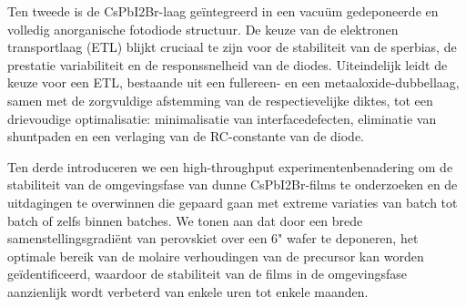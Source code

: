 Ten tweede is de CsPbI2Br-laag geïntegreerd in een vacuüm gedeponeerde en volledig anorganische fotodiode structuur. De keuze van de elektronen transportlaag (ETL) blijkt cruciaal te zijn voor de stabiliteit van de sperbias, de prestatie variabiliteit en de responssnelheid van de diodes. Uiteindelijk leidt de keuze voor een ETL, bestaande uit een fullereen- en een metaaloxide-dubbellaag, samen met de zorgvuldige afstemming van de respectievelijke diktes, tot een drievoudige optimalisatie: minimalisatie van interfacedefecten, eliminatie van shuntpaden en een verlaging van de RC-constante van de
diode.

Ten derde introduceren we een high-throughput experimentenbenadering om de stabiliteit van de omgevingsfase van dunne CsPbI2Br-films te onderzoeken en de uitdagingen te overwinnen die gepaard gaan met extreme variaties van batch tot batch of zelfs binnen batches. We tonen aan dat door een brede samenstellingsgradiënt van perovskiet over een 6" wafer te deponeren, het optimale bereik van de molaire verhoudingen van de precursor kan worden geïdentificeerd, waardoor de stabiliteit van de films in de omgevingsfase aanzienlijk wordt verbeterd van enkele uren tot enkele maanden.


\cleardoublepage

